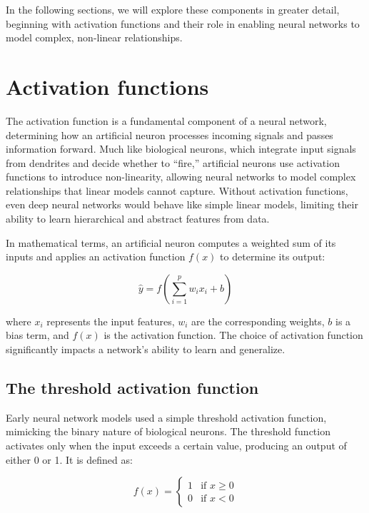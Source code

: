 \documentclass[
]{book}
\theoremstyle{definition}
\theoremstyle{definition}
\theoremstyle{definition}
\theoremstyle{definition}
\theoremstyle{remark}
\begin{document}
In the following sections, we will explore these components in greater detail, beginning with activation functions and their role in enabling neural networks to model complex, non-linear relationships.

\section{Activation functions}\label{activation-functions}

The activation function is a fundamental component of a neural network, determining how an artificial neuron processes incoming signals and passes information forward. Much like biological neurons, which integrate input signals from dendrites and decide whether to ``fire,'' artificial neurons use activation functions to introduce non-linearity, allowing neural networks to model complex relationships that linear models cannot capture. Without activation functions, even deep neural networks would behave like simple linear models, limiting their ability to learn hierarchical and abstract features from data.

In mathematical terms, an artificial neuron computes a weighted sum of its inputs and applies an activation function \(f(x)\) to determine its output:

\[
\hat{y} = f\left( \sum_{i=1}^{p} w_i x_i + b \right)
\]

where \(x_i\) represents the input features, \(w_i\) are the corresponding weights, \(b\) is a bias term, and \(f(x)\) is the activation function. The choice of activation function significantly impacts a network's ability to learn and generalize.

\subsection*{The threshold activation function}\label{the-threshold-activation-function}

Early neural network models used a simple threshold activation function, mimicking the binary nature of biological neurons. The threshold function activates only when the input exceeds a certain value, producing an output of either 0 or 1. It is defined as:

\[
f(x) = 
\begin{cases} 
1 & \text{if } x \geq 0 \\ 
0 & \text{if } x < 0
\end{cases}
\]
\end{document}
